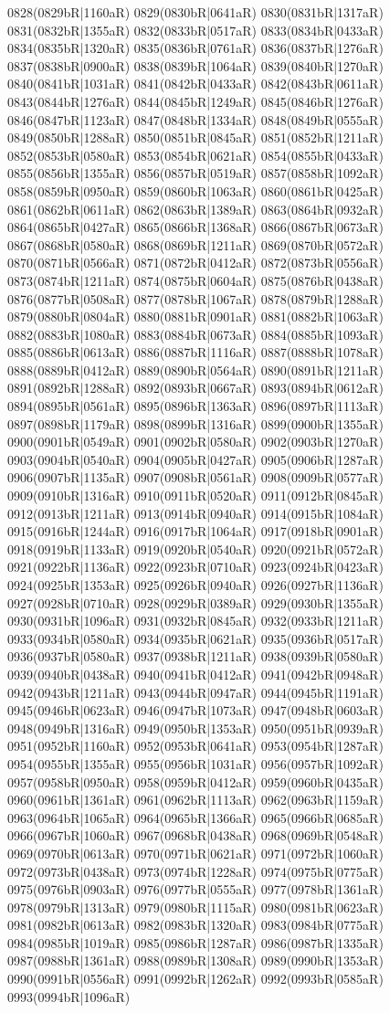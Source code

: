 0828(0829bR|1160aR) 0829(0830bR|0641aR) 0830(0831bR|1317aR) 0831(0832bR|1355aR) 0832(0833bR|0517aR) 0833(0834bR|0433aR) 0834(0835bR|1320aR) 0835(0836bR|0761aR) 0836(0837bR|1276aR) 0837(0838bR|0900aR) 0838(0839bR|1064aR) 0839(0840bR|1270aR) 0840(0841bR|1031aR) 0841(0842bR|0433aR) 0842(0843bR|0611aR) 0843(0844bR|1276aR) 0844(0845bR|1249aR) 0845(0846bR|1276aR) 0846(0847bR|1123aR) 0847(0848bR|1334aR) 0848(0849bR|0555aR) 0849(0850bR|1288aR) 0850(0851bR|0845aR) 0851(0852bR|1211aR) 0852(0853bR|0580aR) 0853(0854bR|0621aR) 0854(0855bR|0433aR) 0855(0856bR|1355aR) 0856(0857bR|0519aR) 0857(0858bR|1092aR) 0858(0859bR|0950aR) 0859(0860bR|1063aR) 0860(0861bR|0425aR) 0861(0862bR|0611aR) 0862(0863bR|1389aR) 0863(0864bR|0932aR) 0864(0865bR|0427aR) 0865(0866bR|1368aR) 0866(0867bR|0673aR) 0867(0868bR|0580aR) 0868(0869bR|1211aR) 0869(0870bR|0572aR) 0870(0871bR|0566aR) 0871(0872bR|0412aR) 0872(0873bR|0556aR) 0873(0874bR|1211aR) 0874(0875bR|0604aR) 0875(0876bR|0438aR) 0876(0877bR|0508aR) 0877(0878bR|1067aR) 0878(0879bR|1288aR) 0879(0880bR|0804aR) 0880(0881bR|0901aR) 0881(0882bR|1063aR) 0882(0883bR|1080aR) 0883(0884bR|0673aR) 0884(0885bR|1093aR) 0885(0886bR|0613aR) 0886(0887bR|1116aR) 0887(0888bR|1078aR) 0888(0889bR|0412aR) 0889(0890bR|0564aR) 0890(0891bR|1211aR) 0891(0892bR|1288aR) 0892(0893bR|0667aR) 0893(0894bR|0612aR) 0894(0895bR|0561aR) 0895(0896bR|1363aR) 0896(0897bR|1113aR) 0897(0898bR|1179aR) 0898(0899bR|1316aR) 0899(0900bR|1355aR) 0900(0901bR|0549aR) 0901(0902bR|0580aR) 0902(0903bR|1270aR) 0903(0904bR|0540aR) 0904(0905bR|0427aR) 0905(0906bR|1287aR) 0906(0907bR|1135aR) 0907(0908bR|0561aR) 0908(0909bR|0577aR) 0909(0910bR|1316aR) 0910(0911bR|0520aR) 0911(0912bR|0845aR) 0912(0913bR|1211aR) 0913(0914bR|0940aR) 0914(0915bR|1084aR) 0915(0916bR|1244aR) 0916(0917bR|1064aR) 0917(0918bR|0901aR) 0918(0919bR|1133aR) 0919(0920bR|0540aR) 0920(0921bR|0572aR) 0921(0922bR|1136aR) 0922(0923bR|0710aR) 0923(0924bR|0423aR) 0924(0925bR|1353aR) 0925(0926bR|0940aR) 0926(0927bR|1136aR) 0927(0928bR|0710aR) 0928(0929bR|0389aR) 0929(0930bR|1355aR) 0930(0931bR|1096aR) 0931(0932bR|0845aR) 0932(0933bR|1211aR) 0933(0934bR|0580aR) 0934(0935bR|0621aR) 0935(0936bR|0517aR) 0936(0937bR|0580aR) 0937(0938bR|1211aR) 0938(0939bR|0580aR) 0939(0940bR|0438aR) 0940(0941bR|0412aR) 0941(0942bR|0948aR) 0942(0943bR|1211aR) 0943(0944bR|0947aR) 0944(0945bR|1191aR) 0945(0946bR|0623aR) 0946(0947bR|1073aR) 0947(0948bR|0603aR) 0948(0949bR|1316aR) 0949(0950bR|1353aR) 0950(0951bR|0939aR) 0951(0952bR|1160aR) 0952(0953bR|0641aR) 0953(0954bR|1287aR) 0954(0955bR|1355aR) 0955(0956bR|1031aR) 0956(0957bR|1092aR) 0957(0958bR|0950aR) 0958(0959bR|0412aR) 0959(0960bR|0435aR) 0960(0961bR|1361aR) 0961(0962bR|1113aR) 0962(0963bR|1159aR) 0963(0964bR|1065aR) 0964(0965bR|1366aR) 0965(0966bR|0685aR) 0966(0967bR|1060aR) 0967(0968bR|0438aR) 0968(0969bR|0548aR) 0969(0970bR|0613aR) 0970(0971bR|0621aR) 0971(0972bR|1060aR) 0972(0973bR|0438aR) 0973(0974bR|1228aR) 0974(0975bR|0775aR) 0975(0976bR|0903aR) 0976(0977bR|0555aR) 0977(0978bR|1361aR) 0978(0979bR|1313aR) 0979(0980bR|1115aR) 0980(0981bR|0623aR) 0981(0982bR|0613aR) 0982(0983bR|1320aR) 0983(0984bR|0775aR) 0984(0985bR|1019aR) 0985(0986bR|1287aR) 0986(0987bR|1335aR) 0987(0988bR|1361aR) 0988(0989bR|1308aR) 0989(0990bR|1353aR) 0990(0991bR|0556aR) 0991(0992bR|1262aR) 0992(0993bR|0585aR) 0993(0994bR|1096aR) 